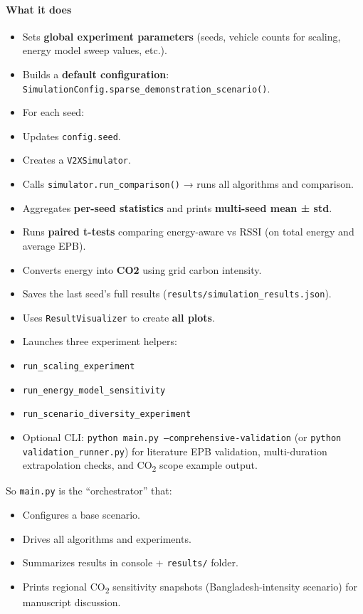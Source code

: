 \documentclass[conference]{IEEEtran}
\begin{document}
\paragraph*{What it does}
\begin{itemize}
\item Sets \textbf{global experiment parameters} (seeds, vehicle counts for scaling, energy model sweep values, etc.).
\item Builds a \textbf{default configuration}: \texttt{SimulationConfig.sparse\_demonstration\_scenario()}.
\item For each seed:
\item Updates \texttt{config.seed}.
\item Creates a \texttt{V2XSimulator}.
\item Calls \texttt{simulator.run\_comparison()} → runs all algorithms and comparison.
\item Aggregates \textbf{per-seed statistics} and prints \textbf{multi-seed mean ± std}.
\item Runs \textbf{paired t-tests} comparing energy-aware vs RSSI (on total energy and average EPB).
\item Converts energy into \textbf{CO2} using grid carbon intensity.
\item Saves the last seed’s full results (\texttt{results/simulation\_results.json}).
\item Uses \texttt{ResultVisualizer} to create \textbf{all plots}.
\item Launches three experiment helpers:
\item \texttt{run\_scaling\_experiment}
\item \texttt{run\_energy\_model\_sensitivity}
\item \texttt{run\_scenario\_diversity\_experiment}
\item Optional CLI: \texttt{python main.py --comprehensive-validation} (or \texttt{python validation\_runner.py}) for literature EPB validation, multi-duration extrapolation checks, and CO\textsubscript{2} scope example output.
\end{itemize}

So \texttt{main.py} is the “orchestrator” that:
\begin{itemize}
\item Configures a base scenario.
\item Drives all algorithms and experiments.
\item Summarizes results in console + \texttt{results/} folder.
\item Prints regional CO\textsubscript{2} sensitivity snapshots (Bangladesh-intensity scenario) for manuscript discussion.
\end{itemize}
\end{document}
